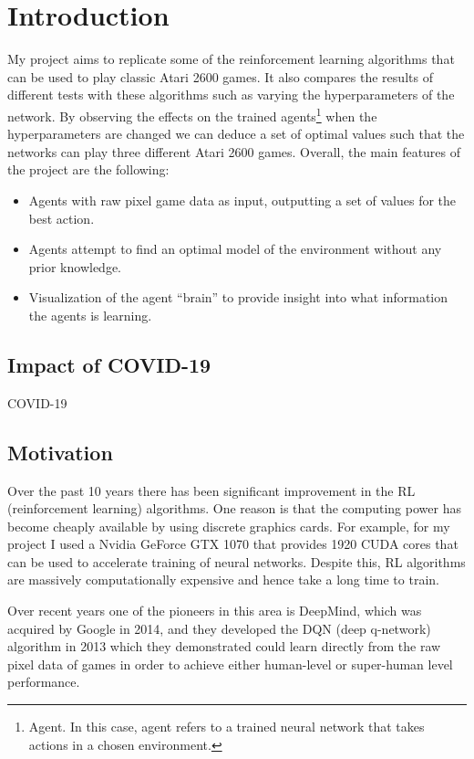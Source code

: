 \chapter{Introduction}
\label{cha:intro}
My project aims to replicate some of the reinforcement learning algorithms that can be used to play classic Atari 2600 games. It also compares the results of different tests with these algorithms such as varying the hyperparameters of the network. By observing the effects on the trained agents\footnote{Agent. In this case, agent refers to a trained neural network that takes actions in a chosen environment.} when the hyperparameters are changed we can deduce a set of optimal values such that the networks can play three different Atari 2600 games. Overall, the main features of the project are the following:
\begin{itemize}
	\item Agents with raw pixel game data as input, outputting a set of values for the best action.
	\item Agents attempt to find an optimal model of the environment without any prior knowledge.
	\item Visualization of the agent ``brain'' to provide insight into what information the agents is learning.
\end{itemize}

\section{Impact of COVID-19}
COVID-19

\section{Motivation}
\label{intro:sec:moti}
Over the past 10 years there has been significant improvement in the RL (reinforcement learning) algorithms. One reason is that the computing power has become cheaply available by using discrete graphics cards. For example, for my project I used a Nvidia GeForce GTX 1070 that provides 1920 CUDA cores that can be used to accelerate training of neural networks. Despite this, RL algorithms are massively computationally expensive and hence take a long time to train.

Over recent years one of the pioneers in this area is DeepMind, which was acquired by Google in 2014, and they developed the DQN (deep q-network) algorithm in 2013 which they demonstrated could learn directly from the raw pixel data of games in order to achieve either human-level or super-human level performance.

